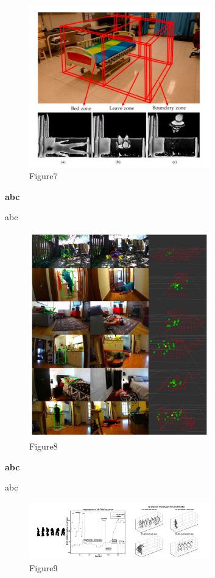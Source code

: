 \documentclass[12pt]{article}
\begin{document}
\begin{figure}[H]
\centering
\includegraphics[width=0.7\textwidth]{Paper3.pic.jpg}
\caption{Figure7} 
\end{figure}

\noindent \textbf{abc}

\noindent abc

\begin{figure}[H]
\centering
\includegraphics[width=0.7\textwidth]{Paper4.pic.jpg}
\caption{Figure8} 
\end{figure}

\noindent \textbf{abc}

\noindent abc

\begin{figure}[H]
\centering
\includegraphics[width=0.7\textwidth]{Paper5.pic.jpg}
\caption{Figure9} 
\end{figure}
\end{document}
